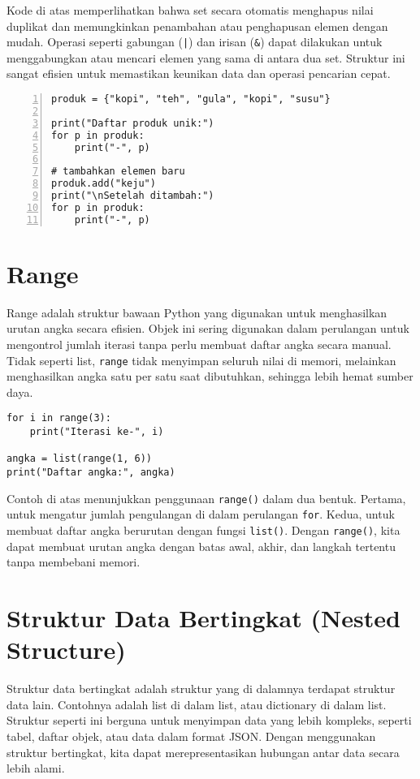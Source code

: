 Kode di atas memperlihatkan bahwa set secara otomatis menghapus nilai duplikat 
dan memungkinkan penambahan atau penghapusan elemen dengan mudah. 
Operasi seperti gabungan (\texttt{|}) dan irisan (\texttt{\&}) dapat dilakukan untuk menggabungkan atau mencari elemen yang sama di antara dua set. 
Struktur ini sangat efisien untuk memastikan keunikan data dan operasi pencarian cepat.

    \begin{lstlisting}[style=PythonStyle, numbers=left, firstnumber=1]
produk = {"kopi", "teh", "gula", "kopi", "susu"}

print("Daftar produk unik:")
for p in produk:
    print("-", p)

# tambahkan elemen baru
produk.add("keju")
print("\nSetelah ditambah:")
for p in produk:
    print("-", p)
    \end{lstlisting}


\section{Range}
Range adalah struktur bawaan Python yang digunakan untuk menghasilkan urutan angka secara efisien. 
Objek ini sering digunakan dalam perulangan untuk mengontrol jumlah iterasi tanpa perlu membuat daftar angka secara manual. 
Tidak seperti list, \texttt{range} tidak menyimpan seluruh nilai di memori, melainkan menghasilkan angka satu per satu saat dibutuhkan, sehingga lebih hemat sumber daya.

\begin{lstlisting}[style=PythonStyle]
for i in range(3):
    print("Iterasi ke-", i)

angka = list(range(1, 6))
print("Daftar angka:", angka)
\end{lstlisting}

Contoh di atas menunjukkan penggunaan \texttt{range()} dalam dua bentuk. 
Pertama, untuk mengatur jumlah pengulangan di dalam perulangan \texttt{for}. 
Kedua, untuk membuat daftar angka berurutan dengan fungsi \texttt{list()}. 
Dengan \texttt{range()}, kita dapat membuat urutan angka dengan batas awal, akhir, dan langkah tertentu tanpa membebani memori.


\section{Struktur Data Bertingkat (Nested Structure)}
Struktur data bertingkat adalah struktur yang di dalamnya terdapat struktur data lain. 
Contohnya adalah list di dalam list, atau dictionary di dalam list. 
Struktur seperti ini berguna untuk menyimpan data yang lebih kompleks, seperti tabel, daftar objek, atau data dalam format JSON. 
Dengan menggunakan struktur bertingkat, kita dapat merepresentasikan hubungan antar data secara lebih alami.


